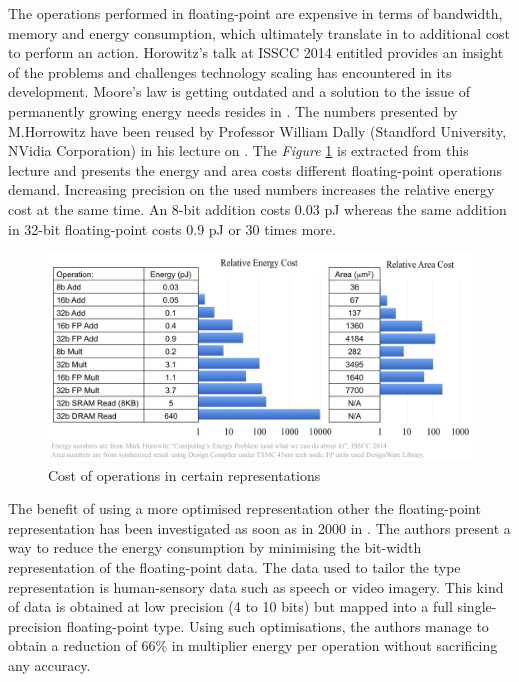 The operations performed in floating-point are expensive in terms of bandwidth, memory and energy consumption, which ultimately translate in to additional cost to perform an action. Horowitz's talk at ISSCC 2014 \cite{Horowitz2014} entitled  provides an insight of the problems and challenges technology scaling has encountered in its development. Moore's law is getting outdated and a solution to the issue of permanently growing energy needs resides in . The numbers presented by M.Horrowitz have been reused by Professor William Dally (Standford University, NVidia Corporation) in his lecture on  \cite{Nips2015}. The \emph{Figure} \ref{fig:OpCosts} is extracted from this lecture and presents the energy and area costs different floating-point operations demand. Increasing precision on the used numbers increases the relative energy cost at the same time. An 8-bit addition costs 0.03 pJ whereas the same addition in 32-bit floating-point costs 0.9 pJ or 30 times more.

\begin{figure}[htbp]
	\centering
		\includegraphics[width=\textwidth]{Figures/OpCosts.png}
	\caption[Operation costs]{Cost of operations in certain representations \cite{Nips2015,Horowitz2014}}
	\label{fig:OpCosts}
\end{figure}

The benefit of using a more optimised representation other the floating-point representation has been investigated as soon as in 2000 in \cite{Tong2000}. The authors present a way to reduce the energy consumption by minimising the bit-width representation of the floating-point data. The data used to tailor the type representation is human-sensory data such as speech or video imagery. This kind of data is obtained at low precision (4 to 10 bits) but mapped into a full single-precision floating-point type. Using such optimisations, the authors manage to obtain a reduction of 66\% in multiplier energy per operation without sacrificing any accuracy.

